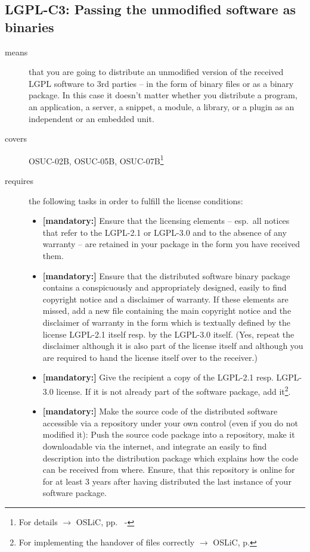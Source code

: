 \subsection{LGPL-C3: Passing the unmodified software as binaries} 
\label{OSUC-02B-LGPL} \label{OSUC-05B-LGPL} \label{OSUC-07B-LGPL} 

\begin{description}
\item[means] that you are going to distribute an unmodified version of the
received LGPL software to 3rd parties -- in the form of binary files or as a
bi\-na\-ry package. In this case it doesn't matter whether you distribute a
program, an application, a server, a snippet, a module, a library, or a plugin
as an independent or an embedded unit.

\item[covers] OSUC-02B, OSUC-05B, OSUC-07B\footnote{For details $\rightarrow$ OSLiC, pp.\
\pageref{OSUC-02B-DEF} - \pageref{OSUC-07B-DEF}}

\item[requires] the following tasks in order to fulfill the license conditions:
\begin{itemize}
  
  \item \textbf{[mandatory:]} Ensure that the licensing elements -- esp.\ all
  notices that refer to the LGPL-2.1 or LGPL-3.0 and to the absence of any
  warranty -- are retained in your package in the form you have received them.

  \item \textbf{[mandatory:]} Ensure that the distributed software binary
  package contains a conspicuously and appropriately designed, easily to find
  copyright notice and a disclaimer of warranty. If these elements are missed,
  add a new file containing the main copyright notice and the disclaimer of
  warranty in the form which is textually defined by the license LGPL-2.1 itself
  resp. by the LGPL-3.0 itself. (Yes, repeat the disclaimer although it is also
  part of the license itself and although you are required to hand the license
  itself over to the receiver.)
  
  \item \textbf{[mandatory:]} Give the recipient a copy of the LGPL-2.1 resp.
  LGPL-3.0 license. If it is not already part of the software package, add
  it\footnote{For implementing the handover of files correctly $\rightarrow$
  OSLiC, p. \pageref{DistributingFilesHint}}.
  
  \item \textbf{[mandatory:]} Make the source code of the distributed software
  accessible via a repository under your own control (even if you do not
  modified it): Push the source code package into a repository, make it
  downloadable via the internet, and integrate an easily to find description
  into the distribution package which explains how the code can be received from
  where. Ensure, that this repository is online for for at least 3 years after
  having distributed the last instance of your software package.
  

\end{itemize}
\end{description}
